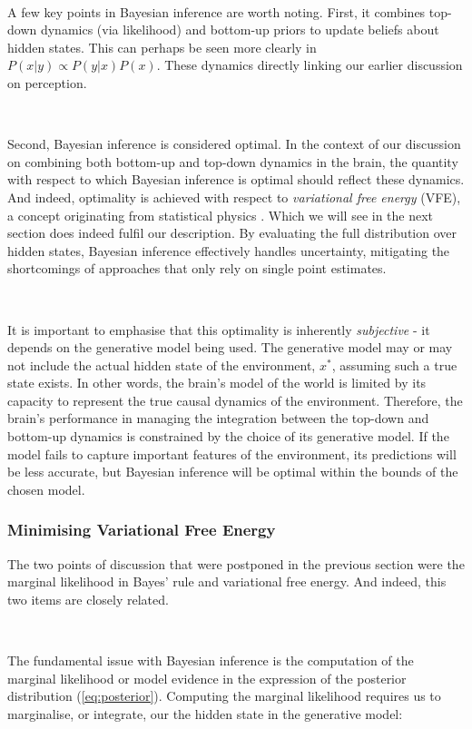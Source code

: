 \documentclass{article}
\newcommand{\refp}[1]{(\ref{#1})}
\begin{document}
\

A few key points in Bayesian inference are worth noting. First, it combines top-down dynamics (via likelihood) and bottom-up priors to update beliefs about hidden states. This can perhaps be seen more clearly in $P(x | y) \propto P(y | x)P(x)$. These dynamics directly linking our earlier discussion on perception.

\

Second, Bayesian inference is considered optimal. In the context of our discussion on combining both bottom-up and top-down dynamics in the brain, the quantity with respect to which Bayesian inference is optimal should reflect these dynamics. And indeed, optimality is achieved with respect to \textit{variational free energy} (VFE), a concept originating from statistical physics \citep{friston2006free}. Which we will see in the next section does indeed fulfil our description. By evaluating the full distribution over hidden states, Bayesian inference effectively handles uncertainty, mitigating the shortcomings of approaches that only rely on single point estimates.

\

It is important to emphasise that this optimality is inherently \textit{subjective} - it depends on the generative model being used. The generative model may or may not include the actual hidden state of the environment, $x^*$, assuming such a true state exists. In other words, the brain's model of the world is limited by its capacity to represent the true causal dynamics of the environment. Therefore, the brain’s performance in managing the integration between the top-down and bottom-up dynamics is constrained by the choice of its generative model. If the model fails to capture important features of the environment, its predictions will be less accurate, but Bayesian inference will be optimal within the bounds of the chosen model.

\subsubsection{Minimising Variational Free Energy}


The two points of discussion that were postponed in the previous section were the marginal likelihood in Bayes' rule and variational free energy. And indeed, this two items are closely related.

\

The fundamental issue with Bayesian inference is the computation of the marginal likelihood or model evidence in the expression of the posterior distribution \refp{eq:posterior}. Computing the marginal likelihood requires us to marginalise, or integrate, our the hidden state in the generative model:
\end{document}
